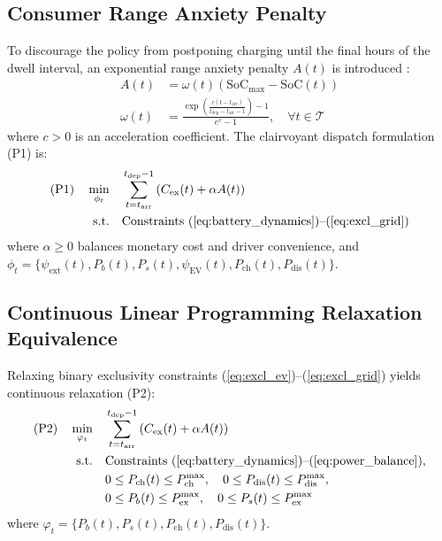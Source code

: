 \documentclass[journal]{IEEEtran}
\theoremstyle{remark}
\begin{document}
\subsection{Consumer Range Anxiety Penalty}
To discourage the policy from postponing charging until the final hours of the dwell interval, an exponential range anxiety penalty $A(t)$ is introduced \cite{huang2024}:
\begin{align}
A(t) &= \omega(t) (\mathrm{SoC}_{\max} - \mathrm{SoC}(t)) \label{eq:range_anxiety}\\
\omega(t) &= \frac{\exp\left(\frac{c(t - t_{\mathrm{arr}})}{t_{\mathrm{dep}} - t_{\mathrm{arr}} - 1}\right) - 1}{e^c - 1}, \quad \forall t \in \mathcal{T}
\end{align}
where $c > 0$ is an acceleration coefficient. The clairvoyant dispatch formulation (P1) is:
\begin{align}
\text{(P1)} \quad \min_{\phi_t} \quad & \sum_{t=t_{\mathrm{arr}}}^{t_{\mathrm{dep}}-1} \left( C_{\mathrm{ex}}(t) + \alpha A(t) \right) \label{eq:p1_objective}\\
\text{s.t.} \quad & \text{Constraints (\ref{eq:battery_dynamics})--(\ref{eq:excl_grid})} \nonumber
\end{align}
where $\alpha \ge 0$ balances monetary cost and driver convenience, and $\phi_t = \{\psi_{\mathrm{ext}}(t), P_b(t), P_s(t), \psi_{\mathrm{EV}}(t), P_{\mathrm{ch}}(t), P_{\mathrm{dis}}(t)\}$.

\subsection{Continuous Linear Programming Relaxation Equivalence}
Relaxing binary exclusivity constraints (\ref{eq:excl_ev})--(\ref{eq:excl_grid}) yields continuous relaxation (P2):
\begin{align}
\text{(P2)} \quad \min_{\varphi_t} \quad & \sum_{t=t_{\mathrm{arr}}}^{t_{\mathrm{dep}}-1} \left( C_{\mathrm{ex}}(t) + \alpha A(t) \right) \label{eq:p2_objective}\\
\text{s.t.} \quad & \text{Constraints (\ref{eq:battery_dynamics})--(\ref{eq:power_balance})}, \nonumber\\
& 0 \le P_{\mathrm{ch}}(t) \le P_{\mathrm{ch}}^{\max}, \quad 0 \le P_{\mathrm{dis}}(t) \le P_{\mathrm{dis}}^{\max}, \label{eq:rel_bounds_ev}\\
& 0 \le P_b(t) \le P_{\mathrm{ex}}^{\max}, \quad 0 \le P_s(t) \le P_{\mathrm{ex}}^{\max} \label{eq:rel_bounds_grid}
\end{align}
where $\varphi_t = \{P_b(t), P_s(t), P_{\mathrm{ch}}(t), P_{\mathrm{dis}}(t)\}$.
\end{document}
